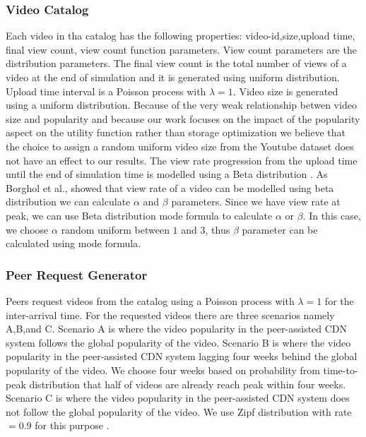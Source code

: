 \documentclass[10pt,final,journal,a4paper]{IEEEtran}
\begin{document}
\subsubsection{Video Catalog}\label{catalog}
Each video in tha catalog has the following properties: 
video-id,size,upload time, final view count, view count function parameters. 
View count parameters are the distribution parameters.
The final view count is the total number of views of a video at the end of simulation and it is generated using uniform distribution.
Upload time interval is a Poisson process with $\lambda=1$.
Video size is generated using a uniform distribution.
Because of the very weak relationship betwen video size and popularity \cite{abhari2010workload} and because our work focuses on the impact of the popularity aspect on the utility function rather than storage optimization we believe that the choice to assign a random uniform video size from the Youtube dataset does not have an effect to our results. 
The view rate progression from the upload time until the end of simulation time is modelled using a Beta distribution \cite{Borghol:2011:CMP:2039452.2039717}.
As Borghol et al.,\cite{Borghol:2011:CMP:2039452.2039717} showed that view rate of a video can be modelled using beta distribution we can calculate $\alpha$ and $\beta$ parameters.
Since we have view rate at peak, we can use Beta distribution mode formula to calculate $\alpha$ or $\beta$. In this case, we choose $\alpha$ random uniform between $1$ and $3$, thus $\beta$ parameter can be calculated using mode formula.


\subsubsection{Peer Request Generator}\label{peerrequest}
Peers request videos from the catalog using a Poisson process with $\lambda=1$ \cite{Zink:2009:CYN:1502814.1502987} for the inter-arrival time.
For the requested videos there are three scenarios namely A,B,and C.
Scenario A is where the video popularity in the peer-assisted CDN system follows the global popularity of the video.
Scenario B is where the video popularity in the peer-assisted CDN system lagging four weeks behind the global popularity of the video. 
We choose four weeks based on probability from time-to-peak distribution that half of videos are already reach peak within four weeks.
Scenario C is where the video popularity in the peer-assisted CDN system does not follow the global popularity of the video. 
We use Zipf distribution with rate$=0.9$ for this purpose \cite{6654887}.
\end{document}
